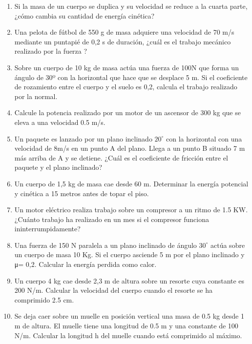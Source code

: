 \begin{enumerate}
\item  Si la masa de un cuerpo se duplica y su velocidad se reduce a la cuarta parte, ¿cómo cambia su cantidad de energía 
cinética?

\item  Una pelota de fútbol de 550 g de masa adquiere una velocidad de 70 m/s mediante un puntapié de 0,2 s de duración, ¿cuál 
es el trabajo mecánico realizado por la fuerza ? 

\item  Sobre un cuerpo de 10 kg de masa actúa una fuerza de 100N que forma un ángulo de 30º con la horizontal que hace que se 
desplace 5 m. Si el coeficiente de rozamiento entre el cuerpo y el suelo es 0,2, calcula el trabajo realizado por la normal. 

\item Calcule la potencia realizado por un motor de un ascensor de 300 kg que se eleva a una velocidad 0.5 m/s.

\item Un paquete es lanzado por un plano inclinado $20^\circ$ con la horizontal con una velocidad de 8m/s en un punto A del 
plano. Llega a un punto B situado 7 m más arriba de A y se detiene. ¿Cuál es el coeficiente de fricción entre el paquete y el
plano inclinado?

\item Un cuerpo de 1,5 kg de masa cae desde 60 m. Determinar la energía potencial y cinética a 15 metros antes de topar el piso.

\item  Un motor eléctrico realiza trabajo sobre un compresor a un ritmo de 1.5 KW. ¿Cuánto trabajo ha realizado en un mes si el 
compresor funciona ininterrumpidamente?

\item Una fuerza de 150 N paralela a un plano inclinado de ángulo $30^\circ$ actúa sobre un cuerpo de masa 10 Kg. Si el cuerpo 
asciende 5 m por el plano inclinado y μ= 0,2. Calcular la energía perdida como calor.

\item  Un cuerpo 4 kg cae desde 2,3 m de altura sobre un resorte cuya constante es 200 N/m. Calcular la velocidad del cuerpo 
cuando el resorte se ha comprimido 2.5 cm.

\item Se deja caer sobre un muelle en posición vertical una masa de 0.5 kg desde 1 m de altura. El muelle tiene una longitud de 
0.5 m y una constante de 100 N/m. Calcular la longitud h del muelle cuando está comprimido al máximo.


\end{enumerate}
